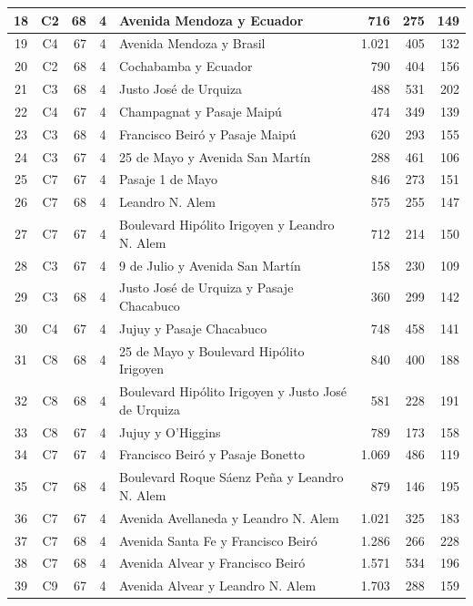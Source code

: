 \begin{longtable}{|c|c|r|c|p{4.2cm}|r|r|r|}
18 & C2 & 68 & 4 & Avenida Mendoza y Ecuador & 716 & 275 & 149 \\ \hline
19 & C4 & 67 & 4 & Avenida Mendoza y Brasil & 1.021 & 405 & 132 \\ \hline
20 & C2 & 68 & 4 & Cochabamba y Ecuador & 790 & 404 & 156 \\ \hline
21 & C3 & 68 & 4 & Justo José de Urquiza & 488 & 531 & 202 \\ \hline
22 & C4 & 67 & 4 & Champagnat y Pasaje Maipú & 474 & 349 & 139 \\ \hline
23 & C3 & 68 & 4 & Francisco Beiró y Pasaje Maipú & 620 & 293 & 155 \\ \hline
24 & C3 & 67 & 4 & 25 de Mayo y Avenida San Martín & 288 & 461 & 106 \\ \hline
25 & C7 & 67 & 4 & Pasaje 1 de Mayo & 846 & 273 & 151 \\ \hline
26 & C7 & 68 & 4 & Leandro N. Alem & 575 & 255 & 147 \\ \hline
27 & C7 & 67 & 4 & Boulevard Hipólito Irigoyen y Leandro N. Alem & 712 & 214 & 150 \\ \hline
28 & C3 & 67 & 4 & 9 de Julio y Avenida San Martín & 158 & 230 & 109 \\ \hline
29 & C3 & 68 & 4 & Justo José de Urquiza y Pasaje Chacabuco & 360 & 299 & 142 \\ \hline
30 & C4 & 67 & 4 & Jujuy y Pasaje Chacabuco & 748 & 458 & 141 \\ \hline
31 & C8 & 68 & 4 & 25 de Mayo y Boulevard Hipólito Irigoyen & 840 & 400 & 188 \\ \hline
32 & C8 & 68 & 4 & Boulevard Hipólito Irigoyen y Justo José de Urquiza & 581 & 228 & 191 \\ \hline
33 & C8 & 67 & 4 & Jujuy y O'Higgins & 789 & 173 & 158 \\ \hline
34 & C7 & 67 & 4 & Francisco Beiró y Pasaje Bonetto & 1.069 & 486 & 119 \\ \hline
35 & C7 & 68 & 4 & Boulevard Roque Sáenz Peña y Leandro N. Alem & 879 & 146 & 195 \\ \hline
36 & C7 & 67 & 4 & Avenida Avellaneda y Leandro N. Alem & 1.021 & 325 & 183 \\ \hline
37 & C7 & 68 & 4 & Avenida Santa Fe y Francisco Beiró & 1.286 & 266 & 228 \\ \hline
38 & C7 & 68 & 4 & Avenida Alvear y Francisco Beiró & 1.571 & 534 & 196 \\ \hline
39 & C9 & 67 & 4 & Avenida Alvear y Leandro N. Alem & 1.703 & 288 & 159 \\ \hline

\end{longtable}
